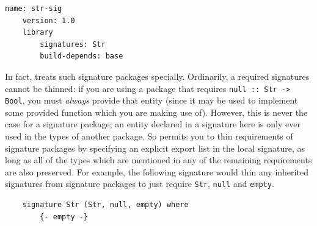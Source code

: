 \begin{lstlisting}[language=Cabal]
    name: str-sig
    version: 1.0
    library
        signatures: Str
        build-depends: base
\end{lstlisting}

\noindent
In fact, \Backpack{} treats such signature packages specially.
Ordinarily, a required signatures cannot be thinned: if you are using a
package that requires \verb|null :: Str -> Bool|, you must \emph{always}
provide that entity (since it may be used to implement some provided
function which you are making use of).  However, this is never the case
for a signature package; an entity declared in a signature here is only
ever used in the types of another package.  So \Backpack{} permits you
to thin requirements of signature packages by specifying an explicit
export list in the local signature, as long as all of the types which
are mentioned in any of the remaining requirements are also preserved.
For example, the following signature would thin any inherited signatures
from signature packages to just require \verb|Str|, \verb|null| and
\verb|empty|.

\begin{lstlisting}
    signature Str (Str, null, empty) where
        {- empty -}
\end{lstlisting}

